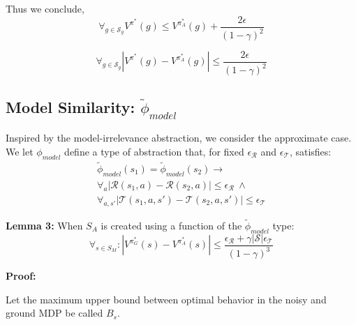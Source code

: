 \documentclass{article}
\newcommand{\ep}{\widetilde \phi}
\begin{document}
Thus we conclude,
\begin{equation*}
\forall_{g \in \mathcal{S}_g} V^{\pi^*}(g) \leq  V^{\pi_{A}^*}(g) + \frac{2\epsilon}{(1-\gamma)^2}
\end{equation*}

\begin{equation*}
\forall_{g \in \mathcal{S}_g} \left | V^{\pi^*}(g) - V^{\pi_{A}^*}(g) \right | \leq  \frac{2\epsilon}{(1-\gamma)^2}
\end{equation*}



\subsection{Model Similarity: $\ep_{model}$}

Inspired by the model-irrelevance abstraction, we consider the approximate case. We let $\phi_{model}$ define a type of abstraction that, for fixed $\epsilon_\mathcal{R}$ and $\epsilon_\mathcal{T}$, satisfies:
\begin{multline}
\ep_{model}(s_1) = \ep_{model}(s_2) \rightarrow \\
\forall_a \left|\mathcal{R}(s_1, a) - \mathcal{R}(s_2, a)\right| \leq \epsilon_\mathcal{R}\ \wedge\ \\
\forall_{a,s'} \left|\mathcal{T}(s_1, a,s') - \mathcal{T}(s_2, a,s')\right| \leq \epsilon_\mathcal{T}
\end{multline}

{\bf Lemma 3:} When $S_A$ is created using a function of the $\ep_{model}$ type:
\begin{equation}
\forall_{s \in S_M} : | V^{\pi^*_G}(s) - V^{\pi^*_{A}}(s) | \leq \frac{{\epsilon_{\mathcal{R}}} + \gamma |\mathcal{S}|\epsilon_{\mathcal{T}}}{(1-\gamma)^3}
\end{equation}

{\bf Proof:}

Let the maximum upper bound between optimal behavior in the noisy and ground MDP be called $B_s$.
\end{document}
